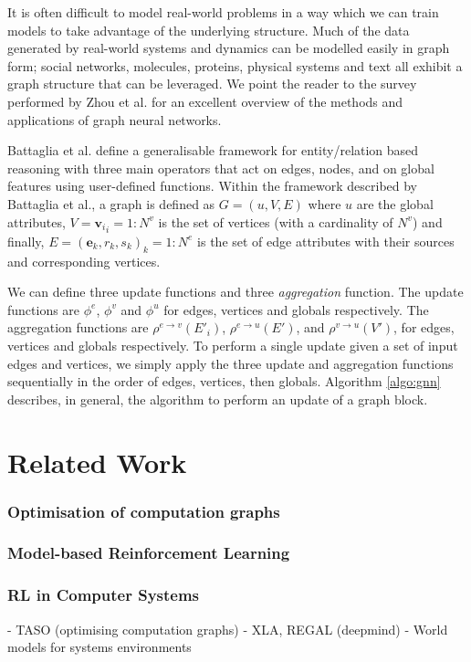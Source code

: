 It is often difficult to model real-world problems in a way which we can train models to take advantage of the underlying structure. Much of the data generated by real-world systems and dynamics can be modelled easily in graph form; social networks, molecules, proteins, physical systems and text all exhibit a graph structure that can be leveraged. We point the reader to the survey performed by Zhou et al. \cite{zhou2020graph} for an excellent overview of the methods and applications of graph neural networks.

Battaglia et al. \cite{battaglia2018relational} define a generalisable framework for entity/relation based reasoning with three main operators that act on edges, nodes, and on global features using user-defined functions. Within the framework described by Battaglia et al., a graph is defined as $G = (u, V, E)$ where $u$ are the global attributes, $V = {\mathbf{v}_i}_i={1:N^v}$ is the set of vertices (with a cardinality of $N^v$) and finally, $E = {(\mathbf{e}_k, r_k, s_k)}_k={1:N^e}$ is the set of edge attributes with their sources and corresponding vertices.



We can define three update functions and three \textit{aggregation} function. The update functions are $\phi^e$, $\phi^v$ and $\phi^u$ for edges, vertices and globals respectively. The aggregation functions are $\rho^{e \rightarrow v} (E'_i)$, $\rho^{e \rightarrow u} (E')$, and $\rho^{v \rightarrow u} (V')$, for edges, vertices and globals respectively. To perform a single update given a set of input edges and vertices, we simply apply the three update and aggregation functions sequentially in the order of edges, vertices, then globals. Algorithm \ref{algo:gnn} describes, in general, the algorithm to perform an update of a graph block.



\section{Related Work}

\subsubsection{Optimisation of computation graphs}

\subsubsection{Model-based Reinforcement Learning}

\subsubsection{RL in Computer Systems}

- TASO (optimising computation graphs)
- XLA, REGAL (deepmind)
- World models for systems environments